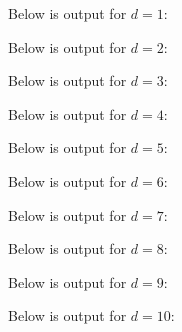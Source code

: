 

Below is output for $d = 1$:



Below is output for $d = 2$:



Below is output for $d = 3$:



Below is output for $d = 4$:



Below is output for $d = 5$:



Below is output for $d = 6$:



Below is output for $d = 7$:



Below is output for $d = 8$:



Below is output for $d = 9$:



Below is output for $d = 10$:



% 